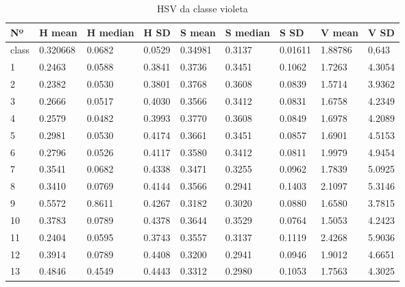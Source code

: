 \begin{anexosenv}
\begin{table}[htbp!]
\centering
\caption{HSV da classe violeta}
\label{tab:cores_classe_violeta}
\begin{tabular}{|l|l|l|l|l|l|l|l|l|}
\hline
Nº & H mean & H median & H SD & S mean & S median & S SD & V mean & V SD \\ \hline
class & 0.320668 & 0.0682   & 0.0529               & 0.34981 & 0.3137   & 0.01611              & 1.88786 & 0,643                \\\hline
1    & 0.2463   & 0.0588   & 0.3841               & 0.3736  & 0.3451   & 0.1062               & 1.7263  & 4.3054               \\
2    & 0.2382   & 0.0530   & 0.3801               & 0.3768  & 0.3608   & 0.0839               & 1.5714  & 3.9362               \\
3    & 0.2666   & 0.0517   & 0.4030               & 0.3566  & 0.3412   & 0.0831               & 1.6758  & 4.2349               \\
4    & 0.2579   & 0.0482   & 0.3993               & 0.3770  & 0.3608   & 0.0849               & 1.6978  & 4.2089               \\
5    & 0.2981   & 0.0530   & 0.4174               & 0.3661  & 0.3451   & 0.0857               & 1.6901  & 4.5153               \\
6    & 0.2796   & 0.0526   & 0.4117               & 0.3580  & 0.3412   & 0.0811               & 1.9979  & 4.9454               \\
7    & 0.3541   & 0.0682   & 0.4338               & 0.3471  & 0.3255   & 0.0962               & 1.7839  & 5.0925               \\
8    & 0.3410   & 0.0769   & 0.4144               & 0.3566  & 0.2941   & 0.1403               & 2.1097  & 5.3146               \\
9    & 0.5572   & 0.8611   & 0.4267               & 0.3182  & 0.3020   & 0.0880               & 1.6580  & 3.7815               \\
10   & 0.3783   & 0.0789   & 0.4378               & 0.3644  & 0.3529   & 0.0764               & 1.5053  & 4.2423               \\
11   & 0.2404   & 0.0595   & 0.3743               & 0.3557  & 0.3137   & 0.1119               & 2.4268  & 5.9036               \\
12   & 0.3914   & 0.0789   & 0.4408               & 0.3200  & 0.2941   & 0.0946               & 1.9012  & 4.6651               \\
13   & 0.4846   & 0.4549   & 0.4443               & 0.3312  & 0.2980   & 0.1053               & 1.7563  & 4.3025               \\

\end{tabular}
\end{table}
\end{anexosenv}
